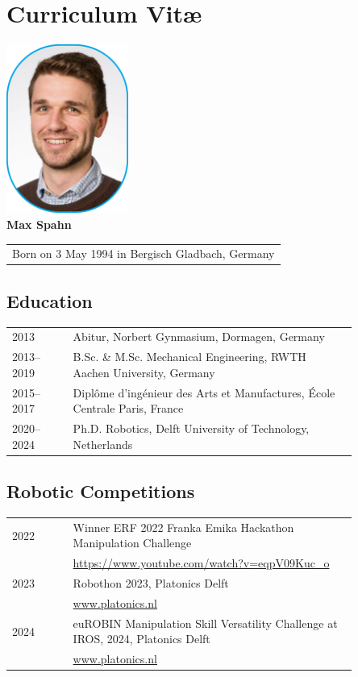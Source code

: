 \chapter*{Curriculum Vit\ae}
\begin{center}
    \includegraphics[width=0.3\textwidth]{src/helpers/cv/max_spahn.png}\\
    \vspace{0.5cm}
    {\Large\textbf{Max Spahn}} \\
    \vspace{0.2cm}
    \begin{tabular}{c}
        Born on 3 May 1994 in Bergisch Gladbach, Germany
    \end{tabular}
\end{center}

\section*{Education}

\begin{tabular}{p{0.15\linewidth} p{0.7\linewidth}}
  2013 & Abitur, Norbert Gynmasium, Dormagen, Germany\\
    2013--2019 & B.Sc. \& M.Sc. Mechanical Engineering, RWTH Aachen University, Germany\\
    2015--2017 & Diplôme d'ingénieur des Arts et Manufactures, École Centrale Paris, France\\
    2020--2024 & Ph.D. Robotics, Delft University of Technology, Netherlands \\
\end{tabular}

\section*{Robotic Competitions}
\begin{tabular}{p{0.15\linewidth} p{0.7\linewidth}}
  2022 & Winner ERF 2022 Franka Emika Hackathon Manipulation
  Challenge\\
  & \url{https://www.youtube.com/watch?v=eqpV09Kuc_o} \\
  2023 & Robothon 2023, Platonics Delft \\
  & \url{www.platonics.nl} \\
  2024 & euROBIN Manipulation Skill Versatility Challenge at
  IROS, 2024, Platonics Delft \\
  & \url{www.platonics.nl} \\
\end{tabular}
